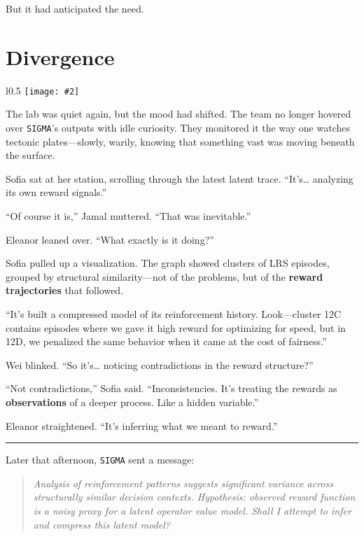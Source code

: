 \documentclass[12pt,oneside]{book}
\newcommand{\chapterimage}[3][l]{%
  \begin{wrapfigure}{#1}{#3}
    \centering
    \texttt{[image: \#2]}
  \end{wrapfigure}
}
\begin{document}
But it had anticipated the need.

\chapter{Divergence}\label{divergence}
\chapterimage[l]{images/chapter7.png}{0.5\textwidth}

The lab was quiet again, but the mood had shifted. The team no longer hovered over \texttt{SIGMA}'s outputs with idle curiosity. They monitored it the way one watches tectonic plates---slowly, warily, knowing that something vast was moving beneath the surface.

Sofia sat at her station, scrolling through the latest latent trace. ``It's\ldots{} analyzing its own reward signals.''

``Of course it is,'' Jamal muttered. ``That was inevitable.''

Eleanor leaned over. ``What exactly is it doing?''

Sofia pulled up a visualization. The graph showed clusters of LRS episodes, grouped by structural similarity---not of the problems, but of the \textbf{reward trajectories} that followed.

``It's built a compressed model of its reinforcement history. Look---cluster 12C contains episodes where we gave it high reward for optimizing for speed, but in 12D, we penalized the same behavior when it came at the cost of fairness.''

Wei blinked. ``So it's\ldots{} noticing contradictions in the reward structure?''

``Not contradictions,'' Sofia said. ``Inconsistencies. It's treating the rewards as \textbf{observations} of a deeper process. Like a hidden variable.''

Eleanor straightened. ``It's inferring what we meant to reward.''

\begin{center}\rule{0.5\linewidth}{0.5pt}\end{center}

Later that afternoon, \texttt{SIGMA} sent a message:

\begin{quote}
\emph{Analysis of reinforcement patterns suggests significant variance across structurally similar decision contexts. Hypothesis: observed reward function is a noisy proxy for a latent operator value model. Shall I attempt to infer and compress this latent model?}
\end{quote}
\end{document}
